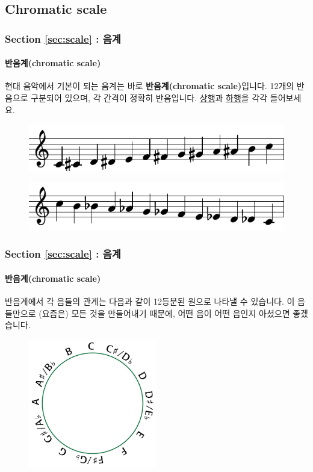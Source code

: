 \documentclass{beamer}
\begin{document}
	\subsection{Chromatic scale}
	\begin{frame}
		\frametitle{Section \ref{sec:scale} : 음계}
		\framesubtitle{반음계(chromatic scale)}
		현대 음악에서 기본이 되는 음계는 바로 {\bf 반음계(chromatic scale)}입니다. 12개의 반음으로 구분되어 있으며, 각 간격이 정확히 반음입니다. {\color{cyan}\href{run:res/mp3/7/scale/chromatic_ascend.mp3}{상행}}과 {\color{cyan}\href{run:res/mp3/7/scale/chromatic_descend.mp3}{하행}}을 각각 들어보세요.
		\begin{figure}
			\centering
			\includegraphics[width=\textwidth]{res/pdf/7/scale/chromatic_ascend.pdf}
		\end{figure}
		\vskip -1.5pc
		\begin{figure}
			\centering
			\includegraphics[width=\textwidth]{res/pdf/7/scale/chromatic_descend.pdf}
		\end{figure}
	\end{frame}
	
	\begin{frame}
		\frametitle{Section \ref{sec:scale} : 음계}
		\framesubtitle{반음계(chromatic scale)}
		반음계에서 각 음들의 관계는 다음과 같이 12등분된 원으로 나타낼 수 있습니다. 이 음들만으로 (요즘은) 모든 것을 만들어내기 때문에, 어떤 음이 어떤 음인지 아셨으면 좋겠습니다.
		\begin{figure}
			\centering
			\includegraphics[width=0.5\textwidth]{res/pdf/7/scale/pitch_circle.pdf}
		\end{figure}
	\end{frame}
	
\end{document}

